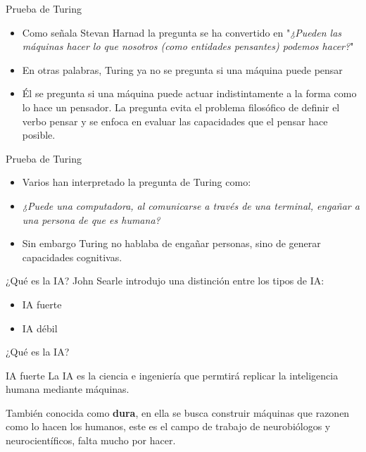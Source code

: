 \documentclass[11pt,aspectratio=169]{beamer}
\begin{document}
\begin{frame}{Prueba de Turing}
    \begin{itemize}
        \item Como señala Stevan Harnad\cite{harnad1} la pregunta se ha convertido en 
            "\textit{¿Pueden las máquinas hacer lo que nosotros (como entidades pensantes) 
            podemos hacer?}" \pause
        \item En otras palabras, Turing ya no se pregunta si una máquina puede pensar
        \item Él se pregunta si una máquina puede actuar indistintamente\cite{harnad2} a la forma 
            como lo hace un pensador. La pregunta evita el problema filosófico de definir el verbo 
            pensar y se enfoca en evaluar las capacidades que el pensar hace posible.
    \end{itemize}
\end{frame}

\begin{frame}{Prueba de Turing}
    \begin{itemize}
        \item Varios han interpretado la pregunta de Turing como: \pause
        \item \textit{¿Puede una computadora, al comunicarse a través de una terminal, engañar 
            a una persona de que es humana?} \pause 
        \item Sin embargo Turing no hablaba de engañar personas, sino de generar capacidades 
            cognitivas.\cite{harnad3}
    \end{itemize}
\end{frame}


\begin{frame}{¿Qué es la IA?}
    John Searle introdujo una distinción entre los tipos de IA\pause \cite{searle}:
    \begin{itemize}
        \item IA fuerte \pause
        \item IA débil
    \end{itemize}
\end{frame}

\begin{frame}{¿Qué es la IA?}
    \begin{block}{IA fuerte}\pause
        La IA es la ciencia e ingeniería que permtirá replicar la inteligencia
        humana mediante máquinas.
    \end{block}\pause
    También conocida como \textbf{dura}, en ella se busca construir máquinas que
    razonen como lo hacen los humanos, este es el campo de trabajo de neurobiólogos
    y neurocientíficos, falta mucho por hacer.
\end{frame}
\end{document}

